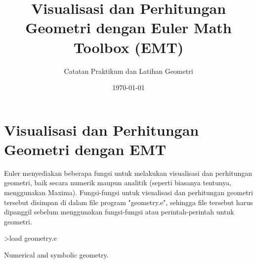 \documentclass[a4paper,11pt,oneside,enabledeprecatedfontcommands]{scrbook}
\title{\textbf{Visualisasi dan Perhitungan Geometri dengan Euler Math Toolbox (EMT)}}
\author{Catatan Praktikum dan Latihan Geometri}
\date{\today}
\newenvironment{eulernotebook}{}{}
\newcommand{\eulerheading}[1]{\chapter{#1}}
\newenvironment{eulercomment}{\par\medskip\noindent}{\par\medskip}
\begin{document}
\maketitle
\tableofcontents

\begin{eulernotebook}

\eulerheading{Visualisasi dan Perhitungan Geometri dengan EMT}
\begin{eulercomment}
Euler menyediakan beberapa fungsi untuk melakukan visualisasi dan perhitungan geometri, baik
secara numerik maupun analitik (seperti biasanya tentunya, menggunakan Maxima).
Fungsi-fungsi untuk visualisasi dan perhitungan geometri tersebut disimpan di dalam file
program "geometry.e", sehingga file tersebut harus dipanggil sebelum menggunakan
fungsi-fungsi atau perintah-perintah untuk geometri.
\end{eulercomment}
\begin{eulerprompt}
>load geometry.e
\end{eulerprompt}
\begin{euleroutput}
Numerical and symbolic geometry.
\end{euleroutput}


\end{eulernotebook}
\end{document}
